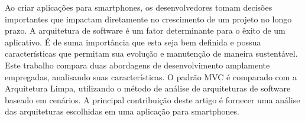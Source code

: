 Ao criar aplicações para smartphones, os desenvolvedores tomam decisões importantes que impactam diretamente no crescimento de um projeto no longo prazo.
A arquitetura de software é um fator determinante para o êxito de um aplicativo.
É de suma importância que esta seja bem definida e possua características que permitam sua evolução e manutenção de maneira sustentável.
Este trabalho compara duas abordagens de desenvolvimento amplamente empregadas, analisando suas características.
O padrão MVC é comparado com a Arquitetura Limpa, utilizando o método de análise de arquiteturas de software baseado em cenários.
A principal contribuição deste artigo é fornecer uma análise das arquiteturas escolhidas em uma aplicação para smartphones.